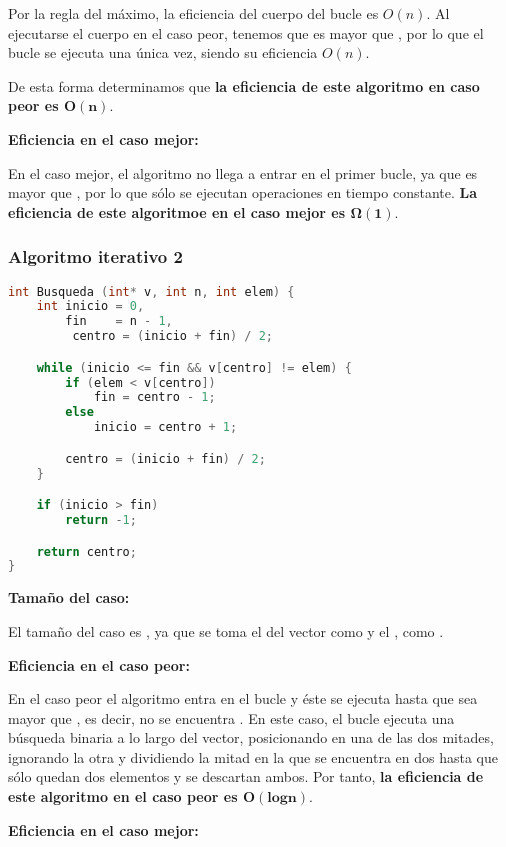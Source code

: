 Por la regla del máximo, la eficiencia del cuerpo del bucle es $O(n)$.
Al ejecutarse el cuerpo en el caso peor, tenemos que  es mayor que , por lo que el bucle  se ejecuta una única vez, siendo su eficiencia $O(n)$.

De esta forma determinamos que \textbf{la eficiencia de este algoritmo en caso peor es $\boldsymbol{O(n)}$}.

\textbf{Eficiencia en el caso mejor:}

En el caso mejor, el algoritmo no llega a entrar en el primer bucle, ya que  es mayor que , por lo que sólo se ejecutan operaciones en tiempo constante.
\textbf{La eficiencia de este algoritmoe en el caso mejor es $\boldsymbol{\Omega(1)}$}.

\subsubsection{Algoritmo iterativo 2}

\begin{lstlisting}[language=C]
int Busqueda (int* v, int n, int elem) {
	int inicio = 0,
	    fin    = n - 1,
		 centro = (inicio + fin) / 2;

	while (inicio <= fin && v[centro] != elem) {
		if (elem < v[centro])
			fin = centro - 1;
		else
			inicio = centro + 1;

		centro = (inicio + fin) / 2;
	}

	if (inicio > fin)
		return -1;

	return centro;
}
\end{lstlisting}

\textbf{Tamaño del caso:}

El tamaño del caso es , ya que se toma el  del vector como  y el , como .

\textbf{Eficiencia en el caso peor:}

En el caso peor el algoritmo entra en el bucle  y éste se ejecuta hasta que  sea mayor que , es decir, no se encuentra .
En este caso, el bucle ejecuta una búsqueda binaria a lo largo del vector, posicionando  en una de las dos mitades, ignorando la otra y dividiendo la mitad en la que se encuentra  en dos hasta que sólo quedan dos elementos y se descartan ambos.
Por tanto, \textbf{la eficiencia de este algoritmo en el caso peor es $\boldsymbol{O(logn)}$}.

\textbf{Eficiencia en el caso mejor:}

